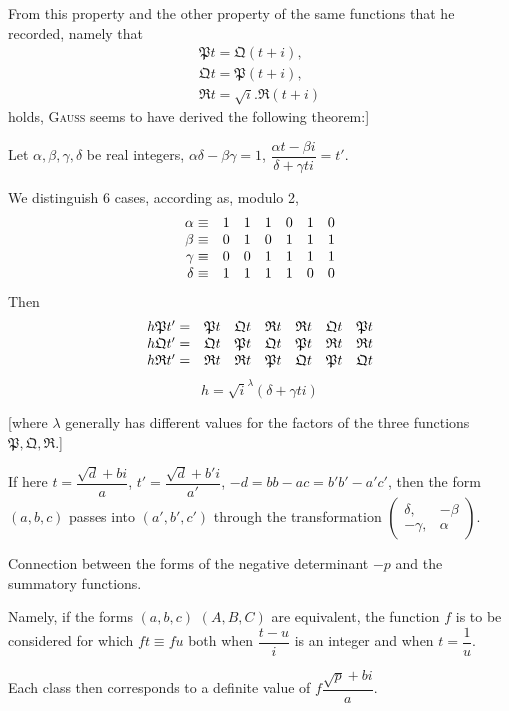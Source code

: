 From this property and the other property of the same functions that he recorded, namely that
\[
\begin{gathered}\mathfrak{P}t=\mathfrak{Q}(t+i),\\[5pt]
\mathfrak{Q}t=\mathfrak{P}(t+i),\\[5pt]
\mathfrak{R}t=\surd i.\mathfrak{R}(t+i)\end{gathered}
\]
holds, \textsc{Gauss} seems to have derived the following theorem:]

\begin{itshape}
Let $\alpha,\allowbreak \beta,\allowbreak \gamma,\allowbreak \delta$ be real integers, $\alpha\delta-\beta\gamma=1$,
$\dfrac{\alpha t-\beta i}{\delta+\gamma ti}=t'$.

We distinguish 6 cases, according as, modulo 2,
\[
\begin{array}{r@{\;}c@{\quad}cccccc}
\alpha&\equiv&1&1&1&0&1&0\\
\beta&\equiv&0&1&0&1&1&1\\
\gamma&\equiv&0&0&1&1&1&1\\
\delta&\equiv&1&1&1&1&0&0
\end{array}
\]
Then
\[
\begin{array}{r@{\;}c@{\quad}cccccc}
h\mathfrak{P}t'&=&\mathfrak{P}t&\mathfrak{Q}t&\mathfrak{R}t&\mathfrak{R}t&\mathfrak{Q}t&\mathfrak{P}t\\
h\mathfrak{Q}t'&=&\mathfrak{Q}t&\mathfrak{P}t&\mathfrak{Q}t&\mathfrak{P}t&\mathfrak{R}t&\mathfrak{R}t\\
h\mathfrak{R}t'&=&\mathfrak{R}t&\mathfrak{R}t&\mathfrak{P}t&\mathfrak{Q}t&\mathfrak{P}t&\mathfrak{Q}t
\end{array}
\]
\[
h=\surd i^\lambda(\delta+\gamma ti)
\]
\end{itshape}

[where $\lambda$ generally has different values for the factors of the three functions $\mathfrak{P},\allowbreak \mathfrak{Q},\allowbreak \mathfrak{R}$.]

\begin{itshape}
If here $t=\dfrac{\surd d+bi}{a}$, $t'=\dfrac{\surd d+b'i}{a'}$,
$-d=bb-ac=b'b'-a'c'$, then the form $(a,\allowbreak b,\allowbreak c)$ passes into $(a',\allowbreak b',\allowbreak c')$ through the transformation
$\left(\begin{smallmatrix}\delta,\allowbreak &-\beta\\-\gamma,\allowbreak &\alpha\end{smallmatrix}\right)$.

Connection between the forms of the negative determinant $-p$ and the summatory functions.

Namely, if the forms $(a,\allowbreak b,\allowbreak c)$ $(A,\allowbreak B,\allowbreak C)$ are equivalent, the function $f$ is to be considered for which $ft\equiv fu$ both when $\dfrac{t-u}{i}$ is an integer and when
$t=\dfrac1u$.
\par
Each class then corresponds to a definite value of $f\dfrac{\surd p+bi}{a}$.
\end{itshape}

